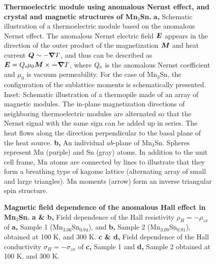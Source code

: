 \documentclass[amsmath,amssymb]{nature}
\begin{document}
\begin{figure}

		\caption {{\bf Thermoelectric module using anomalous Nernst effect, and crystal and magnetic structures of Mn$_3$Sn.}  
			{\bf a,} Schematic illustration of a thermoelectric module based on the anomalous Nernst effect. 
			The anomalous Nernst electric field $\mbox{\boldmath $E$}$ appears in the direction of the outer product of the magnetization $\mbox{\boldmath $M$}$ and heat current $\mbox{\boldmath $Q$} \sim -\mbox{\boldmath $\nabla$} T$, and thus can be described as $\mbox{\boldmath $E$} = Q_{\rm s} \mu_0\mbox{\boldmath $M$} \times \mbox{\boldmath $-\nabla$}T$, where $Q_{\rm s}$ is the anomalous Nernst coefficient and $\mu_0$ is vacuum permeability. For the case of Mn$_3$Sn, the configuration of the sublattice moments is schematically presented.
			Inset: Schematic illustration of a thermopile made of an array of magnetic modules.  The in-plane magnetization directions of neighboring thermoelectric modules are alternated so that the Nernst signal with the same sign can be added up in series. The heat flows along the direction perpendicular to the basal plane of the heat source. %
			{\bf b,} An individual $ab$-plane of Mn$_3$Sn. Spheres represent Mn (purple) and Sn (gray) atoms.  In addition to the unit cell frame, Mn atoms are connected by lines to illustrate that they form a breathing type of kagome lattice (alternating array of small and large triangles). Mn moments (arrow) form an inverse triangular spin structure. %
		} 

\end{figure}

\begin{figure}

\caption {{\bf Magnetic field dependence of the anomalous Hall effect in Mn$_3$Sn.}
{\bf a \& b,} Field dependence of the Hall resistivity $\rho_{H}=-\rho_{zx}$ of {\bf a,} Sample 1 (Mn$_{3.06}$Sn$_{0.94}$), and {\bf b,} Sample 2 (Mn$_{3.09}$Sn$_{0.91}$), obtained at 100 K, and 300 K. 
{\bf c \& d,} Field dependence of the Hall conductivity $\sigma_{H}=-\sigma_{zx}$ of {\bf c,} Sample 1 and {\bf d,} Sample 2 obtained at 100 K, and 300 K.} 

\end{figure}
\end{document}
